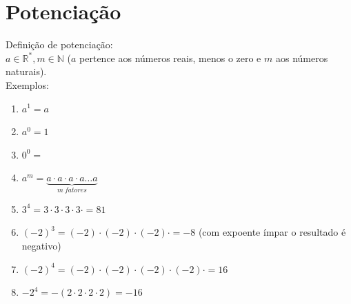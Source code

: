 \section{Potenciação}
Definição de potenciação:\\

$ a \in \mathbb{R}^{*}, m \in \mathbb{N} $ ($ a $ pertence aos números reais, menos o zero e $ m $ aos números naturais).\\

Exemplos:

\begin{enumerate}[label=\alph*)]
\item $ a^{1} = a $
\item $ a^{0} = 1 $
\item $ 0^{0} = $ \textquestiondown
\item $ a^{m} = \underbrace{a \cdot a \cdot a \cdot a \ldots a}_{m\  fatores} $
\item $ 3^{4} = 3\cdot 3\cdot 3\cdot 3\cdot = 81 $
\item $ (-2)^{3} = (-2)\cdot (-2)\cdot (-2)\cdot = -8 $ (com expoente ímpar o resultado é negativo) 
\item $ (-2)^{4} = (-2)\cdot (-2)\cdot (-2)\cdot (-2)\cdot = 16 $
\item $ -2^{4} = -(2\cdot 2\cdot 2\cdot 2) = -16 $
\end{enumerate}

